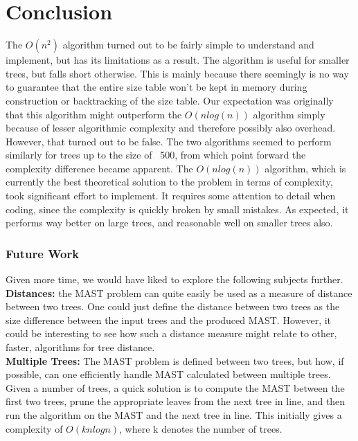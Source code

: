 \chapter{Conclusion}
\label{ch:conclusion}
The $O(n^2)$ algorithm turned out to be fairly simple to understand and implement, but has its limitations as a result. The algorithm is useful for smaller trees, but falls short otherwise. This is mainly because there seemingly is no way to guarantee that the entire size table won't be kept in memory during construction or backtracking of the size table. Our expectation was originally that this algorithm might outperform the $O(nlog(n))$ algorithm simply because of lesser algorithmic complexity and therefore possibly also overhead. However, that turned out to be false. The two algorithms seemed to perform similarly for trees up to the size of ~500, from which point forward the complexity difference became apparent.
The $O(nlog(n))$ algorithm, which is currently the best theoretical solution to the problem in terms of complexity, took significant effort to implement. It requires some attention to detail when coding, since the complexity is quickly broken by small mistakes. As expected, it performs way better on large trees, and reasonable well on smaller trees also.

\subsection{Future Work}
Given more time, we would have liked to explore the following subjects further.\\

\noindent\textbf{Distances:} the MAST problem can quite easily be used as a measure of distance between two trees. One could just define the distance between two trees as the size difference between the input trees and the produced MAST. However, it could be interesting to see how such a distance measure might relate to other, faster, algorithms for tree distance. \\ 

\noindent\textbf{Multiple Trees:} The MAST problem is defined between two trees, but how, if possible, can one efficiently handle MAST calculated between multiple trees. Given a number of trees, a quick solution is to compute the MAST between the first two trees, prune the appropriate leaves from the next tree in line, and then run the algorithm on the MAST and the next tree in line. This initially gives a complexity of $O(knlogn)$, where k denotes the number of trees. \\   

